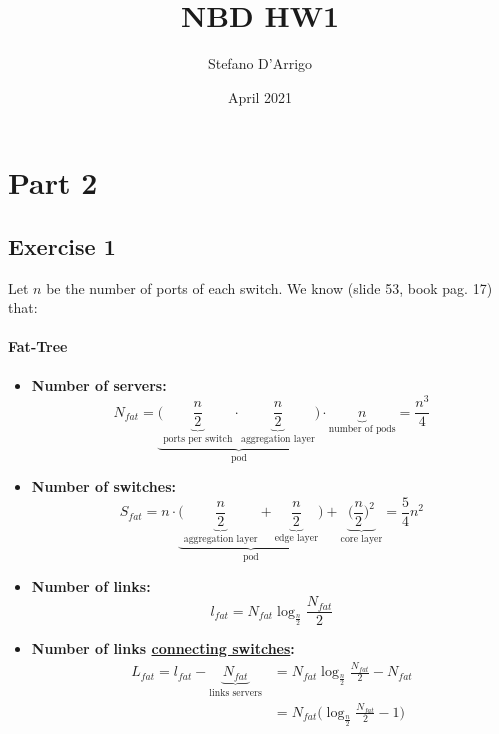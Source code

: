\documentclass{article}
\title{NBD HW1}
\author{Stefano D'Arrigo}
\date{April 2021}
\begin{document}
\maketitle

\section{Part 2}
\subsection{Exercise 1}
Let $n$ be the number of ports of each switch. We know (slide 53, book pag. 17) that:
\paragraph{Fat-Tree}
\begin{itemize}
    \item \textbf{Number of servers:}
    \begin{equation}
        N_{fat} = \underbrace{\Big(\underbrace{\frac{n}{2}}_{\text{ports per switch}} \cdot \underbrace{\frac{n}{2}}_{\text{aggregation layer}}\Big)}_{\text{pod}} \cdot \underbrace{n}_{\text{number of pods}} = \frac{n^3}{4}
    \end{equation}
    \item \textbf{Number of switches:}
    \begin{equation}
        S_{fat} = n \cdot \underbrace{\Big(\underbrace{\frac{n}{2}}_{\text{aggregation layer}} + \underbrace{\frac{n}{2}}_{\text{edge layer}}\Big)}_{\text{pod}} 
        + \underbrace{\Big(\frac{n}{2}\Big)^2}_{\text{core layer}} = \frac{5}{4}n^2
    \end{equation}
    \item \textbf{Number of links:}
    \begin{equation}
        l_{fat} = N_{fat} \log_{\frac{n}{2}} \frac{N_{fat}}{2}
    \end{equation}
    \item \textbf{Number of links \underline{connecting switches}:}
    \begin{equation}
        \begin{split}
            L_{fat} = l_{fat} - \underbrace{N_{fat}}_{\text{links servers}} &= N_{fat} \log_{\frac{n}{2}} \frac{N_{fat}}{2} - N_{fat} \\ &= N_{fat} \Big(\log_{\frac{n}{2}} \frac{N_{fat}}{2} - 1\Big)
        \end{split}
    \end{equation}
\end{itemize}
\end{document}
